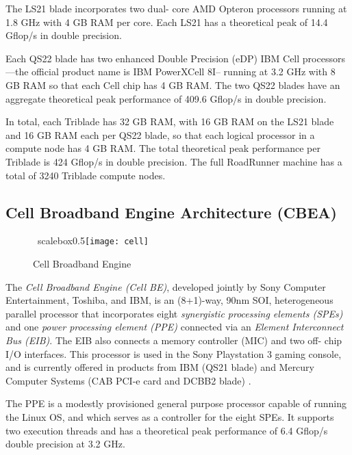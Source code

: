 \documentclass[letter,10pt]{article}
\begin{document}
The LS21 blade incorporates two dual-
core AMD Opteron processors running at 1.8 GHz with 4 GB RAM per 
core.  Each LS21 has a theoretical peak of 14.4 Gflop/s in double 
precision.

Each QS22 blade has two enhanced Double Precision (eDP) 
IBM Cell processors ---the official product name is IBM PowerXCell 
8I-- running at 3.2 GHz with 8 GB RAM so that each Cell chip has 4 GB 
RAM.  The two QS22 blades have an aggregate theoretical peak 
performance of 409.6 Gflop/s in double precision.

In total, each 
Triblade has 32 GB RAM, with 16 GB RAM on the LS21 blade and 16 GB RAM 
each per QS22 blade, so that each logical processor in a compute node 
has 4 GB RAM.  The total theoretical peak performance per Triblade is 
424 Gflop/s in double precision.  The full RoadRunner machine has a 
total of 3240 Triblade compute nodes.

\subsection*{Cell Broadband 
Engine Architecture (CBEA)}

\begin{figure}
    \begin{center}
    \
scalebox{0.5}{\texttt{[image: cell]}}
    \caption{Cell Broadband 
Engine}
    \label{image:cell}
    \end{center}
\end{figure}

The \emph{Cell Broadband Engine (Cell BE)}, developed jointly by Sony 
Computer Entertainment, Toshiba, and IBM, is an (8+1)-way, 90nm SOI, 
heterogeneous parallel processor that incorporates eight \emph{
synergistic processing elements (SPEs)} and one \emph{power processing 
element (PPE)} connected via an \emph{Element Interconnect Bus (EIB)}.  
The EIB also connects a memory controller (MIC) and two off-
chip I/O interfaces.  This processor is used in the Sony Playstation 3 
gaming console, and is currently offered in products from IBM (QS21 
blade) and Mercury Computer Systems (CAB PCI-e card and DCBB2 blade) \cite{mercury}.

The PPE is a modestly provisioned general purpose 
processor capable of running the Linux OS, and which serves as a 
controller for the eight SPEs.  It supports two execution threads and 
has a theoretical peak performance of 6.4 Gflop/s double precision at 
3.2 GHz.
\end{document}
